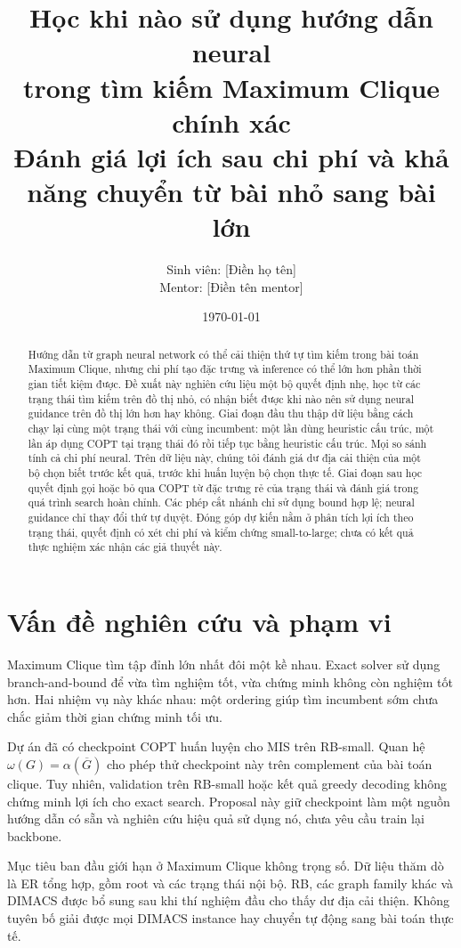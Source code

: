 \documentclass[11pt,a4paper]{article}
\title{\Large Học khi nào sử dụng hướng dẫn neural\\trong tìm kiếm Maximum Clique chính xác\\[0.4em]
\large Đánh giá lợi ích sau chi phí và khả năng chuyển từ bài nhỏ sang bài lớn}
\author{Sinh viên: [Điền họ tên]\\Mentor: [Điền tên mentor]}
\date{\today}
\begin{document}
\maketitle
\begin{abstract}
Hướng dẫn từ graph neural network có thể cải thiện thứ tự tìm kiếm trong bài toán Maximum Clique, nhưng chi phí tạo đặc trưng và inference có thể lớn hơn phần thời gian tiết kiệm được. Đề xuất này nghiên cứu liệu một bộ quyết định nhẹ, học từ các trạng thái tìm kiếm trên đồ thị nhỏ, có nhận biết được khi nào nên sử dụng neural guidance trên đồ thị lớn hơn hay không. Giai đoạn đầu thu thập dữ liệu bằng cách chạy lại cùng một trạng thái với cùng incumbent: một lần dùng heuristic cấu trúc, một lần áp dụng COPT tại trạng thái đó rồi tiếp tục bằng heuristic cấu trúc. Mọi so sánh tính cả chi phí neural. Trên dữ liệu này, chúng tôi đánh giá dư địa cải thiện của một bộ chọn biết trước kết quả, trước khi huấn luyện bộ chọn thực tế. Giai đoạn sau học quyết định gọi hoặc bỏ qua COPT từ đặc trưng rẻ của trạng thái và đánh giá trong quá trình search hoàn chỉnh. Các phép cắt nhánh chỉ sử dụng bound hợp lệ; neural guidance chỉ thay đổi thứ tự duyệt. Đóng góp dự kiến nằm ở phân tích lợi ích theo trạng thái, quyết định có xét chi phí và kiểm chứng small-to-large; chưa có kết quả thực nghiệm xác nhận các giả thuyết này.
\end{abstract}

\section{Vấn đề nghiên cứu và phạm vi}
Maximum Clique tìm tập đỉnh lớn nhất đôi một kề nhau. Exact solver sử dụng branch-and-bound để vừa tìm nghiệm tốt, vừa chứng minh không còn nghiệm tốt hơn. Hai nhiệm vụ này khác nhau: một ordering giúp tìm incumbent sớm chưa chắc giảm thời gian chứng minh tối ưu.

Dự án đã có checkpoint COPT huấn luyện cho MIS trên RB-small. Quan hệ $\omega(G)=\alpha(\overline G)$ cho phép thử checkpoint này trên complement của bài toán clique. Tuy nhiên, validation trên RB-small hoặc kết quả greedy decoding không chứng minh lợi ích cho exact search. Proposal này giữ checkpoint làm một nguồn hướng dẫn có sẵn và nghiên cứu hiệu quả sử dụng nó, chưa yêu cầu train lại backbone.

Mục tiêu ban đầu giới hạn ở Maximum Clique không trọng số. Dữ liệu thăm dò là ER tổng hợp, gồm root và các trạng thái nội bộ. RB, các graph family khác và DIMACS được bổ sung sau khi thí nghiệm đầu cho thấy dư địa cải thiện. Không tuyên bố giải được mọi DIMACS instance hay chuyển tự động sang bài toán thực tế.
\end{document}
